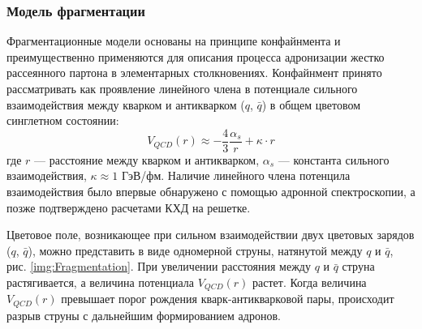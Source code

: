 \subsubsection{Модель фрагментации} \label{ch1/fragmentation}
Фрагментационные модели основаны на принципе конфайнмента и преимущественно применяются для описания процесса адронизации жестко рассеянного партона в элементарных столкновениях. 
%
Конфайнмент принято рассматривать \cite{FragmentationLund} как проявление линейного члена в потенциале сильного взаимодействия между кварком и антикварком ($q$, $\bar{q}$) в общем цветовом синглетном состоянии:
$$ V_{QCD}(r) \approx -\frac{4}{3} \frac{\alpha_s}{r} +\kappa \cdot r$$
где $r$ — расстояние между кварком и антикварком, $\alpha_{s}$ — константа сильного взаимодействия, $\kappa \approx 1$ ГэВ/фм.
Наличие линейного члена потенцила взаимодействия было впервые обнаружено с помощью адронной спектроскопии, а позже подтверждено расчетами КХД на решетке. 

Цветовое поле, возникающее при сильном взаимодействии двух цветовых зарядов ($q$, $\bar{q}$), можно представить в виде одномерной струны, натянутой между $q$ и $\bar{q}$, рис. \ref{img:Fragmentation}. 
При увеличении расстояния между $q$ и $\bar{q}$ струна растягивается, а величина потенциала $V_{QCD}(r)$ растет. Когда величина $V_{QCD}(r)$ превышает порог рождения кварк-антикварковой пары, происходит разрыв струны с дальнейшим формированием адронов.  

